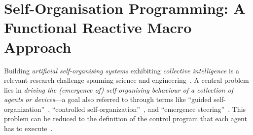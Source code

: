 

\theoremstyle{definition}
\newtheorem{example}{Example}
    
\newtheorem{theorem}{Theorem}
\chapter[Self-Organisation Programming]{
Self-Organisation Programming: A Functional Reactive Macro Approach
}\label{chap:eng:frp}%
\minitoc%

Building \emph{artificial self-organising systems} 
 exhibiting \emph{collective intelligence}
 is a relevant research challenge 
 spanning science and engineering~\cite{DBLP:journals/ker/ParunakB15,gershenson2007design-sos,DBLP:conf/uksim/SinghSP13,DBLP:journals/sttt/NicolaJW20}.
%
A central problem lies in \emph{driving the (emergence of) self-organising behaviour
of a collection of agents or devices}---a goal also referred to through terms like
``guided self-organization''~\cite{prokopenko2009guided-selforg},
``controlled self-organization''~\cite{DBLP:journals/taas/SchmeckMCMR10}, and
``emergence steering''~\cite{DBLP:conf/sysose/Giammarco17a}.
%
This problem can be reduced to the definition of the control program
 that each agent has to execute~\cite{DBLP:journals/tib/MartiusH12}.
%

